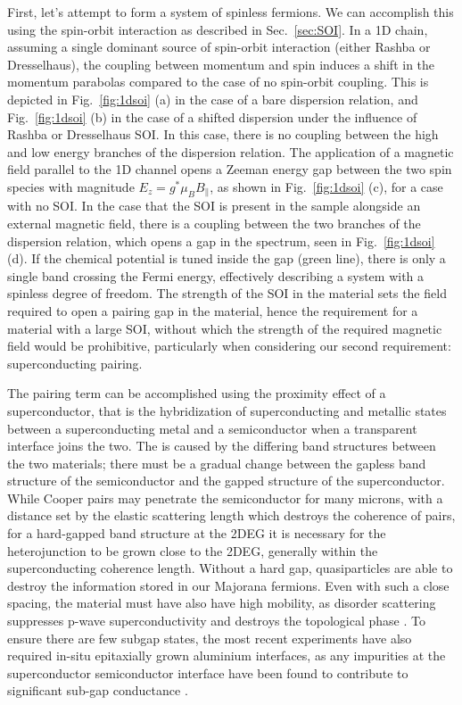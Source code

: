 First, let's attempt to form a system of spinless fermions. We can accomplish this using the spin-orbit interaction as described in
Sec.~\ref{sec:SOI}. In a 1D chain, assuming a single dominant source of spin-orbit interaction (either Rashba or Dresselhaus), the coupling between momentum
and spin induces a shift in the momentum parabolas compared to the case of no spin-orbit coupling. This is depicted in Fig.~\ref{fig:1dsoi} (a) in the case of a bare
dispersion relation, and Fig.~\ref{fig:1dsoi} (b) in the case of a shifted dispersion under the influence of Rashba or Dresselhaus SOI. In this case, there is
no coupling between the high and low energy branches of the dispersion relation. The application of a magnetic field parallel to the 1D channel opens a Zeeman energy
gap between the two spin species with magnitude $E_z = g^* \mu_B B_\parallel$, as shown in Fig.~\ref{fig:1dsoi} (c), for a case with no SOI. In the case that the
SOI is present in the sample alongside an external magnetic field, there is a coupling between the two branches of the dispersion relation, which opens a gap in the
spectrum, seen in Fig.~\ref{fig:1dsoi} (d). If the chemical
potential is tuned inside the gap (green line), there is only a single band crossing the Fermi energy, effectively describing a system with a spinless degree of freedom.
The strength of the SOI in the material sets the field required to open a pairing gap in the material, hence the requirement for a material with a large SOI, without
which the strength of the required magnetic field would be prohibitive, particularly when considering our second requirement: superconducting pairing.

The pairing term can be accomplished using the proximity effect of a superconductor, that is the hybridization of superconducting and metallic states
between a superconducting metal and a semiconductor when a transparent interface joins the two. The is caused by the differing band structures between
the two materials; there must be a gradual change between the gapless band structure of the semiconductor and the gapped structure of the superconductor.
While Cooper pairs may penetrate the semiconductor for many microns, with a distance set by the elastic scattering length which destroys the coherence
of pairs, for a hard-gapped band structure at the 2DEG it is necessary for the heterojunction to be grown close to the 2DEG, generally within the
superconducting coherence length. Without a hard gap, quasiparticles are able to destroy the information stored in our Majorana fermions. Even with such a close spacing,
the material must have also have high mobility, as disorder scattering suppresses p-wave superconductivity and destroys the topological phase \cite{PhysRevB.84.144526}.
To ensure there are few subgap states, the most recent experiments have also required in-situ epitaxially grown aluminium interfaces, as any impurities at the superconductor
semiconductor interface have been found to contribute to significant sub-gap conductance \cite{nnano.2014.306}.

